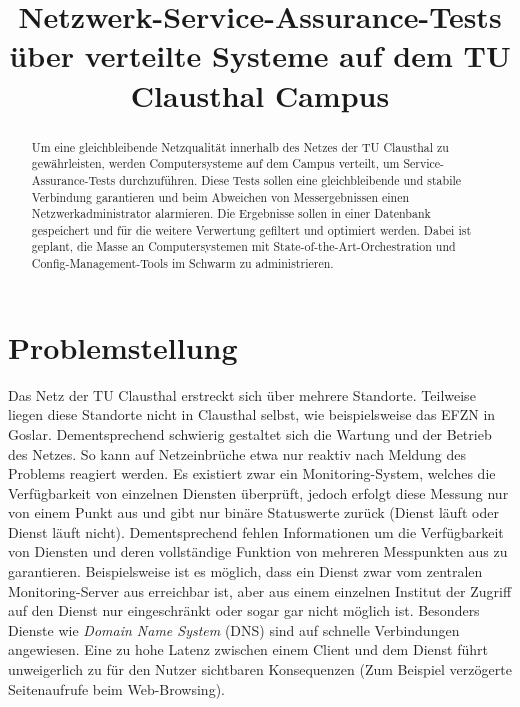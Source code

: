 \documentclass[conference]{IEEEtran}
\begin{document}
\title{Netzwerk-Service-Assurance-Tests über verteilte Systeme auf dem
TU Clausthal Campus}
\author{
}

\maketitle

\begin{abstract}
Um eine gleichbleibende Netzqualität innerhalb des Netzes der
TU Clausthal zu gewährleisten, werden Computersysteme auf dem
Campus verteilt, um Service-Assurance-Tests durchzuführen. Diese
Tests sollen eine gleichbleibende und stabile Verbindung garantieren
und beim Abweichen von Messergebnissen einen Netzwerkadministrator
alarmieren. Die Ergebnisse sollen in einer Datenbank gespeichert und
für die weitere Verwertung gefiltert und optimiert
werden. Dabei ist geplant, die Masse an Computersystemen mit
State-of-the-Art-Orchestration und Config-Management-Tools im
Schwarm zu administrieren.
\end{abstract}

\IEEEpeerreviewmaketitle

\section*{Problemstellung}
Das Netz der TU Clausthal erstreckt sich über mehrere Standorte.
Teilweise liegen diese Standorte nicht in Clausthal selbst, wie
beispielsweise das EFZN in Goslar. Dementsprechend schwierig gestaltet
sich die Wartung und der Betrieb des Netzes. So kann auf Netzeinbrüche
etwa nur reaktiv nach Meldung des Problems reagiert werden. Es existiert
zwar ein Monitoring-System, welches die Verfügbarkeit von einzelnen
Diensten überprüft, jedoch erfolgt diese Messung nur von einem Punkt aus
und gibt nur binäre Statuswerte zurück (Dienst läuft oder Dienst läuft
nicht). Dementsprechend fehlen Informationen um die Verfügbarkeit von
Diensten und deren vollständige Funktion von mehreren Messpunkten aus zu
garantieren. Beispielsweise ist es möglich, dass ein Dienst zwar vom
zentralen Monitoring-Server aus erreichbar ist, aber aus einem einzelnen
Institut der Zugriff auf den Dienst nur eingeschränkt oder sogar gar
nicht möglich ist. Besonders Dienste wie \textit{Domain Name System}
(DNS) sind auf schnelle Verbindungen angewiesen. Eine zu hohe Latenz
zwischen einem Client und dem Dienst führt unweigerlich zu für den
Nutzer sichtbaren Konsequenzen (Zum Beispiel verzögerte Seitenaufrufe beim
Web-Browsing).
\end{document}

